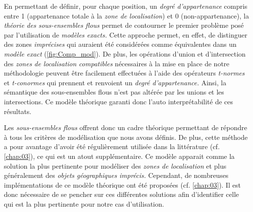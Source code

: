 En permettant de définir, pour chaque position, un \emph{degré
  d'appartenance} compris entre 1 (appartenance totale à la \emph{zone
  de localisation}) et 0 (non-appartenance), la \emph{théorie des
  sous-ensembles flous} permet de contourner le premier problème posé
par l'utilisation de \emph{modèles exacts.} Cette approche permet, en
effet, de distinguer des zones \emph{imprécises} qui auraient été
considérées comme équivalentes dans un \emph{modèle exact}
(\autoref{fig:Comp_mod}). De plus, les opérations d'union et
d'intersection des \emph{zones de localisation compatibles}
nécessaires à la mise en place de notre méthodologie peuvent être
facilement effectuées à l'aide des opérateurs \emph{t-normes} et
\emph{t-conormes} qui prennent et renvoient un \emph{degré
  d'appartenance.} Ainsi, la sémantique des sous-ensembles flous n'est
pas altérée par les unions et les intersections. Ce modèle théorique
garanti donc l'auto interprétabilité de ces résultats.

Les \emph{sous-ensembles flous} offrent donc un cadre théorique
permettant de répondre à tous les critères de modélisation que nous
avons définis. De plus, cette méthode a pour avantage d'avoir été
régulièrement utilisée dans la littérature (cf. \autoref{chap:03}), ce
qui est un atout supplémentaire. Ce modèle apparait comme la solution
la plus pertinente pour modéliser des \emph{zones de localisation} et
plus généralement des \emph{objets géographiques imprécis.} Cependant,
de nombreuses implémentations de ce modèle théorique ont été proposées
(cf. \autoref{chap:03}). Il est donc nécessaire de se pencher sur ces
différentes solutions afin d'identifier celle qui est la plus
pertinente pour notre cas d'utilisation.


